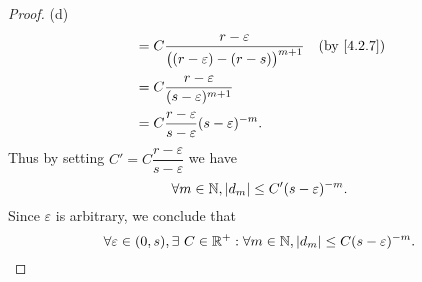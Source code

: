 \begin{proof}{(d)}
\begin{align*}
                                & = C \dfrac{r - \varepsilon}{\big((r - \varepsilon) - (r - s)\big)^{m + 1}}                      &  & \text{(by \cref{4.2.7})}    \\
                                & = C \dfrac{r - \varepsilon}{(s - \varepsilon)^{m + 1}}                                                                           \\
                                & = C \dfrac{r - \varepsilon}{s - \varepsilon} (s - \varepsilon)^{-m}.
  \end{align*}
  Thus by setting \(C' = C \dfrac{r - \varepsilon}{s - \varepsilon}\) we have
  \[
    \forall m \in \mathbb{N}, \left\lvert d_m\right\rvert \leq C' (s - \varepsilon)^{-m}.
  \]
  Since \(\varepsilon\) is arbitrary, we conclude that
  \[
    \forall \varepsilon \in (0, s), \exists\ C \in \mathbb{R}^+ : \forall m \in \mathbb{N}, \left\lvert d_m\right\rvert \leq C (s - \varepsilon)^{-m}.
  \]
\end{proof}

